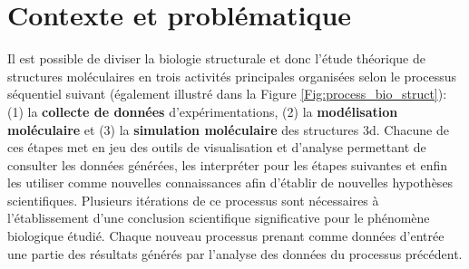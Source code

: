 



\section*{Contexte et problématique}

Il est possible de diviser la biologie structurale et donc l'étude théorique de structures moléculaires en trois activités principales organisées selon le processus séquentiel suivant (également illustré dans la Figure \ref{Fig:process_bio_struct}): (1) la \textbf{collecte de données} d'expérimentations, (2) la \textbf{modélisation moléculaire} et (3) la \textbf{simulation moléculaire} des structures 3d. Chacune de ces étapes met en jeu des outils de visualisation et d'analyse permettant de consulter les données générées, les interpréter pour les étapes suivantes et enfin les utiliser comme nouvelles connaissances afin d'établir de nouvelles hypothèses scientifiques. Plusieurs itérations de ce processus sont nécessaires à l'établissement d'une conclusion scientifique significative pour le phénomène biologique étudié. Chaque nouveau processus prenant comme données d'entrée une partie des résultats générés par l'analyse des données du processus précédent.

